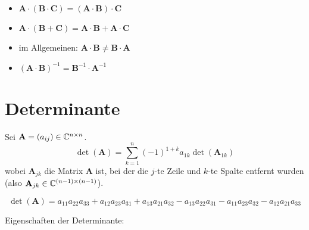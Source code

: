 \begin{itemize}
	\item $\mathbf{A} \cdot (\mathbf{B} \cdot \mathbf{C}) = (\mathbf{A} \cdot \mathbf{B}) \cdot \mathbf{C}$
	
	\item $\mathbf{A} \cdot (\mathbf{B} + \mathbf{C}) = \mathbf{A} \cdot \mathbf{B} + \mathbf{A} \cdot \mathbf{C}$
	
	\item im Allgemeinen: $\mathbf{A} \cdot \mathbf{B} \neq \mathbf{B} \cdot \mathbf{A}$
	
	\item $(\mathbf{A} \cdot \mathbf{B})^{-1} = \mathbf{B}^{-1} \cdot \mathbf{A}^{-1}$
	
\end{itemize}

\section{Determinante}

\begin{frameddefn}
	Sei $\mathbf{A} = (a_{ij}) \in \mathbb{C}^{n\times n}$.
	\[
	\det(\mathbf{A}) = \sum_{k=1}^{n} (-1)^{1+k} a_{1k} \det(\mathbf{A}_{1k})
	\]
	wobei $\mathbf{A}_{jk}$ die Matrix $\mathbf{A}$ ist, bei der die $j$-te Zeile und $k$-te Spalte entfernt wurden (also $\mathbf{A}_{jk} \in \mathbb{C}^{(n-1) \times (n-1)}$).
\end{frameddefn}

\begin{framedthm}
	\[
	\det(\mathbf{A}) = a_{11} a_{22} a_{33} + a_{12} a_{23} a_{31} + a_{13} a_{21} a_{32} - a_{13} a_{22} a_{31} - a_{11} a_{23} a_{32} - a_{12} a_{21} a_{33}
	\]
\end{framedthm}

Eigenschaften der Determinante:


